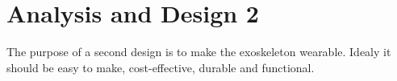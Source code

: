\section{Analysis and Design 2}

The purpose of a second design is to make the exoskeleton wearable. Idealy it should be easy to make, cost-effective, durable and functional. 